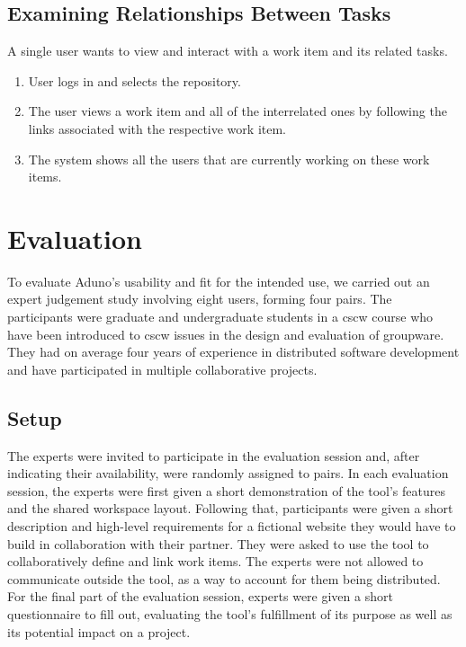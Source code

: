 \documentclass[conference]{IEEEtran}
\begin{document}
\subsection{Examining Relationships Between Tasks}
A single user wants to view and interact with a work item and its related tasks. 
\begin{enumerate}
	\item User logs in and selects the repository.
	\item The user views a work item and all of the interrelated ones by following the links associated with the respective work item.
	\item The system shows all the users that are currently working on these work items.
\end{enumerate}

\section{Evaluation}
\label{sec:evaluation}

To evaluate Aduno's usability and fit for the intended use, we carried out an expert judgement study involving eight users, forming four pairs. The participants were graduate and undergraduate students in a {\sc cscw} course who have been introduced to {\sc cscw} issues in the design and evaluation of groupware. They had on average four years of experience in distributed software development and have participated in multiple collaborative projects.

\subsection{Setup}
The experts were invited to participate in the evaluation session and, after indicating their availability, were randomly assigned to pairs. In each evaluation session, the experts were first given a short demonstration of the tool's features and the shared workspace layout. Following that, participants were given a short description and high-level requirements for a fictional website they would have to build in collaboration with their partner. They were asked to use the tool to collaboratively define and link work items. The experts were not allowed to communicate outside the tool, as a way to account for them being distributed. For the final part of the evaluation session, experts were given a short questionnaire to fill out, evaluating the tool's fulfillment of its purpose as well as its potential impact on a project.
\end{document}
